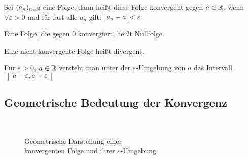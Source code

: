 \begin{definition}
    Sei $(a_n)_{n\in\mathbb{N}}$ eine Folge, dann heißt diese Folge konvergent gegen $a\in\mathbb{R}$, wenn $\forall \varepsilon > 0$ und für fast alle $a_n$ gilt: $\left|a_n-a\right|<\varepsilon$
\end{definition}

\begin{definition}[Nullfolge]
    Eine Folge, die gegen $0$ konvergiert, heißt Nullfolge.
\end{definition}

\begin{definition}[Divergenz]
    Eine nicht-konvergente Folge heißt divergent.
\end{definition}

\begin{definition}
    Für $\varepsilon > 0$, $a\in\mathbb{R}$ versteht man unter der $\varepsilon$-Umgebung von $a$ das Intervall $\left]a-\varepsilon, a+\varepsilon\right[$
\end{definition}

\subsection{Geometrische Bedeutung der Konvergenz}

\begin{visualisierung}
    ~
    \begin{figure}[H]
        \centering
        \caption{Geometrische Darstellung einer\\ konvergenten Folge und ihrer $\varepsilon$-Umgebung}
    \end{figure}
\end{visualisierung}



